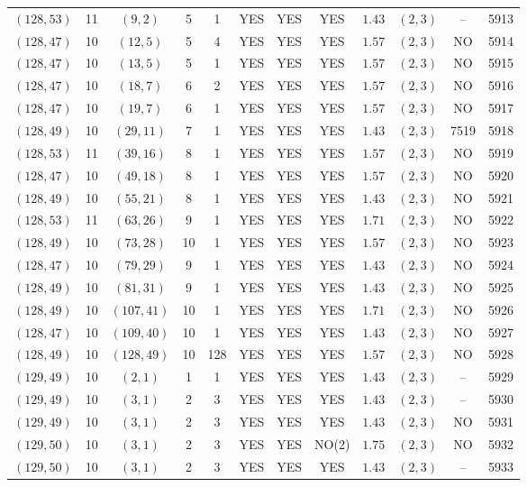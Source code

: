 \begin{longtable}{|c|c|c|c|c|c|c|c|c|c|c|c|}
$(128,53)$ & 11 & $(9,2)$ & 5 & 1 & YES & YES & YES & $1.43$ & $(2,3)$ & -- & 5913\\
$(128,47)$ & 10 & $(12,5)$ & 5 & 4 & YES & YES & YES & $1.57$ & $(2,3)$ & NO & 5914\\
$(128,47)$ & 10 & $(13,5)$ & 5 & 1 & YES & YES & YES & $1.57$ & $(2,3)$ & NO & 5915\\
$(128,47)$ & 10 & $(18,7)$ & 6 & 2 & YES & YES & YES & $1.57$ & $(2,3)$ & NO & 5916\\
$(128,47)$ & 10 & $(19,7)$ & 6 & 1 & YES & YES & YES & $1.57$ & $(2,3)$ & NO & 5917\\
$(128,49)$ & 10 & $(29,11)$ & 7 & 1 & YES & YES & YES & $1.43$ & $(2,3)$ & 7519 & 5918\\
$(128,53)$ & 11 & $(39,16)$ & 8 & 1 & YES & YES & YES & $1.57$ & $(2,3)$ & NO & 5919\\
$(128,47)$ & 10 & $(49,18)$ & 8 & 1 & YES & YES & YES & $1.57$ & $(2,3)$ & NO & 5920\\
$(128,49)$ & 10 & $(55,21)$ & 8 & 1 & YES & YES & YES & $1.43$ & $(2,3)$ & NO & 5921\\
$(128,53)$ & 11 & $(63,26)$ & 9 & 1 & YES & YES & YES & $1.71$ & $(2,3)$ & NO & 5922\\
$(128,49)$ & 10 & $(73,28)$ & 10 & 1 & YES & YES & YES & $1.57$ & $(2,3)$ & NO & 5923\\
$(128,47)$ & 10 & $(79,29)$ & 9 & 1 & YES & YES & YES & $1.43$ & $(2,3)$ & NO & 5924\\
$(128,49)$ & 10 & $(81,31)$ & 9 & 1 & YES & YES & YES & $1.43$ & $(2,3)$ & NO & 5925\\
$(128,49)$ & 10 & $(107,41)$ & 10 & 1 & YES & YES & YES & $1.71$ & $(2,3)$ & NO & 5926\\
$(128,47)$ & 10 & $(109,40)$ & 10 & 1 & YES & YES & YES & $1.43$ & $(2,3)$ & NO & 5927\\
$(128,49)$ & 10 & $(128,49)$ & 10 & 128 & YES & YES & YES & $1.57$ & $(2,3)$ & NO & 5928\\
$(129,49)$ & 10 & $(2,1)$ & 1 & 1 & YES & YES & YES & $1.43$ & $(2,3)$ & -- & 5929\\
$(129,49)$ & 10 & $(3,1)$ & 2 & 3 & YES & YES & YES & $1.43$ & $(2,3)$ & -- & 5930\\
$(129,49)$ & 10 & $(3,1)$ & 2 & 3 & YES & YES & YES & $1.43$ & $(2,3)$ & NO & 5931\\
$(129,50)$ & 10 & $(3,1)$ & 2 & 3 & YES & YES & NO(2) & $1.75$ & $(2,3)$ & NO & 5932\\
$(129,50)$ & 10 & $(3,1)$ & 2 & 3 & YES & YES & YES & $1.43$ & $(2,3)$ & -- & 5933\\

\end{longtable}

